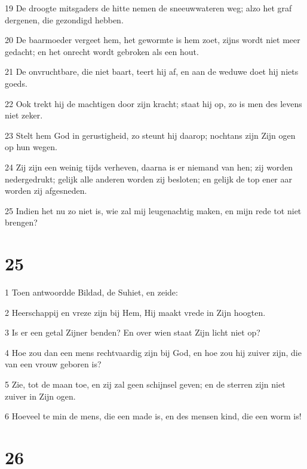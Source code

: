 \par 19 De droogte mitsgaders de hitte nemen de sneeuwwateren weg; alzo het graf dergenen, die gezondigd hebben.
\par 20 De baarmoeder vergeet hem, het gewormte is hem zoet, zijns wordt niet meer gedacht; en het onrecht wordt gebroken als een hout.
\par 21 De onvruchtbare, die niet baart, teert hij af, en aan de weduwe doet hij niets goeds.
\par 22 Ook trekt hij de machtigen door zijn kracht; staat hij op, zo is men des levens niet zeker.
\par 23 Stelt hem God in gerustigheid, zo steunt hij daarop; nochtans zijn Zijn ogen op hun wegen.
\par 24 Zij zijn een weinig tijds verheven, daarna is er niemand van hen; zij worden nedergedrukt; gelijk alle anderen worden zij besloten; en gelijk de top ener aar worden zij afgesneden.
\par 25 Indien het nu zo niet is, wie zal mij leugenachtig maken, en mijn rede tot niet brengen?

\chapter{25}

\par 1 Toen antwoordde Bildad, de Suhiet, en zeide:
\par 2 Heerschappij en vreze zijn bij Hem, Hij maakt vrede in Zijn hoogten.
\par 3 Is er een getal Zijner benden? En over wien staat Zijn licht niet op?
\par 4 Hoe zou dan een mens rechtvaardig zijn bij God, en hoe zou hij zuiver zijn, die van een vrouw geboren is?
\par 5 Zie, tot de maan toe, en zij zal geen schijnsel geven; en de sterren zijn niet zuiver in Zijn ogen.
\par 6 Hoeveel te min de mens, die een made is, en des mensen kind, die een worm is!

\chapter{26}

